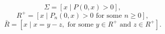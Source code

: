 $$\Sigma = [x \mid P(0,x) > 0],$$
$$R^+ = [x \mid P_n(0,x) > 0 \text{ for some } n \geq 0],$$
$$\bar{R} = [x \mid x = y - z, \text{ for some } y \in R^+ \text{ and } z \in R^+].$$